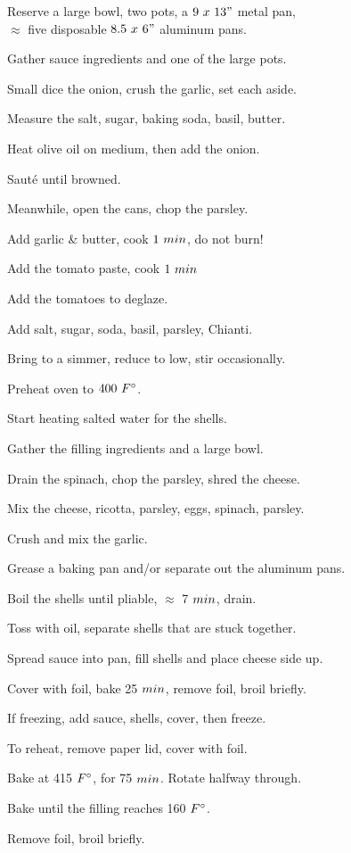 \begin{preparation}
\item Reserve a large bowl, two pots, a $9~x~13"$ metal pan,\\
    $\approx$ five disposable $8.5~x~6"$ aluminum pans.
\item Gather sauce ingredients and one of the large pots.
\item Small dice the onion, crush the garlic, set each aside.
\item Measure the salt, sugar, baking soda, basil, butter.
\item Heat olive oil on medium, then add the onion.
\item Saut\'{e} until browned.
\item Meanwhile, open the cans, chop the parsley.
\item Add garlic \& butter, cook $1~\minute$, do not burn!
\item Add the tomato paste, cook $1~\minute$
\item Add the tomatoes to deglaze.
\item Add salt, sugar, soda, basil, parsley, Chianti.
\item Bring to a simmer, reduce to low, stir occasionally.
\item Preheat oven to $400~\Fahrenheit$.
\item Start heating salted water for the shells.
\item Gather the filling ingredients and a large bowl.
\item Drain the spinach, chop the parsley, shred the cheese.
\item Mix the cheese, ricotta, parsley, eggs, spinach, parsley.
\item Crush and mix the garlic.
\item Grease a baking pan and/or separate out the aluminum pans.
\item Boil the shells until pliable, $\approx$ 7 $\minute$, drain.
\item Toss with oil, separate shells that are stuck together.
\item Spread sauce into pan, fill shells and place cheese side up.
\item Cover with foil, bake 25 $\minute$, remove foil, broil briefly.
\item If freezing, add sauce, shells, cover, then freeze.
\item To reheat, remove paper lid, cover with foil.
\item Bake at 415 $\Fahrenheit$, for 75 $\minute$.
    Rotate halfway through.
\item Bake until the filling reaches 160 $\Fahrenheit$.
\item Remove foil, broil briefly.
\end{preparation}

\recipeend%
